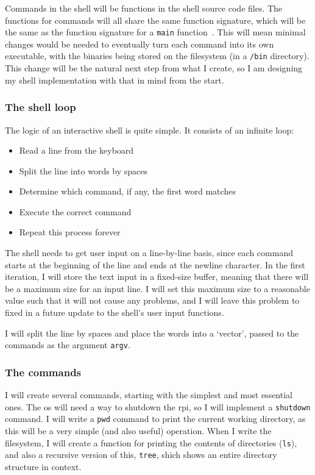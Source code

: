 \documentclass{article}
\begin{document}
Commands in the shell will be functions in the shell source code files. The
functions for commands will all share the same function signature, which will
be the same as the function signature for a \texttt{main}
function~\cite{c-main-func}. This will mean minimal changes would be needed to
eventually turn each command into its own executable, with the binaries being
stored on the filesystem (in a \texttt{/bin} directory). This change will be
the natural next step from what I create, so I am designing my shell
implementation with that in mind from the start.

\subsubsection{The shell loop}
The logic of an interactive shell is quite simple. It consists of an infinite
loop:

\begin{itemize}
    \item Read a line from the keyboard
    \item Split the line into words by spaces
    \item Determine which command, if any, the first word matches
    \item Execute the correct command
    \item Repeat this process forever
\end{itemize}

The shell needs to get user input on a line-by-line basis, since each command
starts at the beginning of the line and ends at the newline character. In the
first iteration, I will store the text input in a fixed-size buffer, meaning
that there will be a maximum size for an input line. I will set this maximum
size to a reasonable value such that it will not cause any problems, and I will
leave this problem to fixed in a future update to the shell's user input
functions.

I will split the line by spaces and place the words into a `vector',
passed to the commands as the argument \texttt{argv}.

\subsubsection{The commands}
I will create several commands, starting with the simplest and most essential
ones. The \gls{os} will need a way to shutdown the \gls{rpi}, so I will
implement a \texttt{shutdown} command. I will write a \texttt{pwd} command to
print the current working directory, as this will be a very simple (and also
useful) operation. When I write the filesystem, I will create a function for
printing the contents of directories (\texttt{ls}), and also a recursive
version of this, \texttt{tree}, shich shows an entire directory structure in
context.
\end{document}
